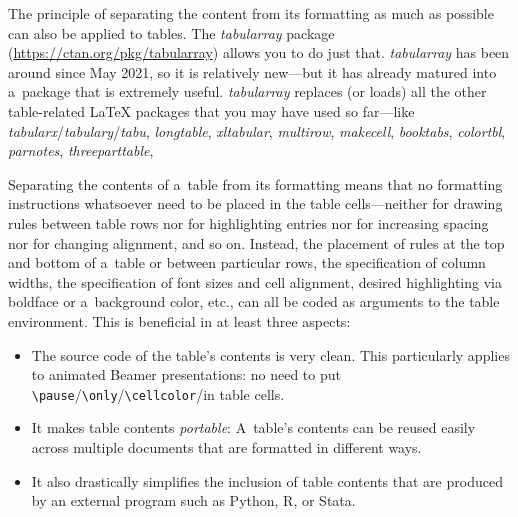 The principle of separating the content from its formatting as much as possible can also be applied to tables. The \mbox{\textit{tabularray}} package (\url{https://ctan.org/pkg/tabularray}) allows you to do just that. \mbox{\textit{tabularray}} has been around since May 2021, so it is relatively new---but it has already matured into a~package that is extremely useful. \mbox{\textit{tabularray}} replaces (or loads) all the other table-related LaTeX packages that you may have used so far---like \mbox{\textit{tabularx}}\slash\mbox{\textit{tabulary}}\slash\mbox{\textit{tabu}}, \mbox{\textit{longtable}}, \mbox{\textit{xltabular}}, \mbox{\textit{multirow}}, \mbox{\textit{makecell}}, \mbox{\textit{booktabs}}, \mbox{\textit{colortbl}}, \mbox{\textit{parnotes}}, \mbox{\textit{threeparttable}}, \textellipsis

Separating the contents of a~table from its formatting means that no formatting instructions whatsoever need to be placed in the table cells---neither for drawing rules between table rows nor for highlighting entries nor for increasing spacing nor for changing alignment, and so on. Instead, the placement of rules at the top and bottom of a~table or between particular rows, the specification of column widths, the specification of font sizes and cell alignment, desired highlighting via boldface or a~background color, etc., can all be coded as arguments to the table environment. This is beneficial in at least three aspects:
\begin{itemize}
	\item The source code of the table's contents is very clean. This particularly applies to animated Beamer presentations: no need to put \verb|\pause|\slash \verb|\only|\slash \verb|\cellcolor|\slash\textellipsis in table cells.
	\item  It makes table contents \emph{portable}: A~table's contents can be reused easily across multiple documents that are formatted in different ways.
	\item  It also drastically simplifies the inclusion of table contents that are produced by an external program such as Python, R, or Stata.
\end{itemize}

